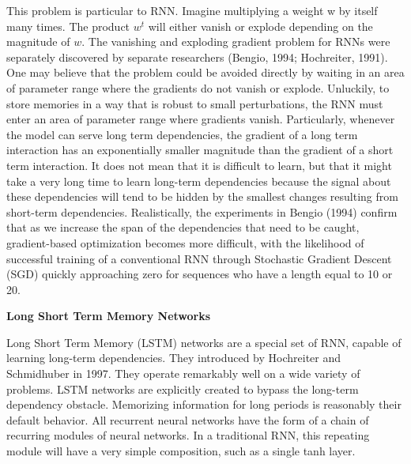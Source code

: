 This problem is particular to RNN. Imagine multiplying a weight w by itself many times.
The product $w^t$ will either vanish or explode depending on the magnitude of $w$.
The vanishing and exploding gradient problem for RNNs were separately discovered by separate researchers (Bengio, 1994;
Hochreiter, 1991).
One may believe that the problem could be avoided directly by waiting in an area of parameter range where the gradients do not vanish or explode.
Unluckily, to store memories in a way that is robust to small perturbations, the RNN must enter an area of parameter range where gradients vanish.
Particularly, whenever the model can serve long term dependencies,
the gradient of a long term interaction has an exponentially smaller magnitude than the gradient of a short term interaction.
It does not mean that it is difficult to learn, but that it might take a very long time to learn long-term dependencies
because the signal about these dependencies will tend to be hidden by the smallest changes resulting from short-term dependencies.
Realistically, the experiments in Bengio (1994) confirm that as we increase the span of the dependencies that need to be caught,
gradient-based optimization becomes more difficult, with the likelihood of successful training of a conventional
RNN through Stochastic Gradient Descent (SGD) quickly approaching zero for sequences who have a length equal to 10 or 20.

{\large \textbf{Long Short Term Memory Networks}}

Long Short Term Memory (LSTM) networks are a special set of RNN, capable of learning long-term dependencies.
They introduced by Hochreiter and Schmidhuber in 1997.
They operate remarkably well on a wide variety of problems.
LSTM networks are explicitly created to bypass the long-term dependency obstacle.
Memorizing information for long periods is reasonably their default behavior.
All recurrent neural networks have the form of a chain of recurring modules of neural networks.
In a traditional RNN, this repeating module will have a very simple composition, such as a single tanh layer.

